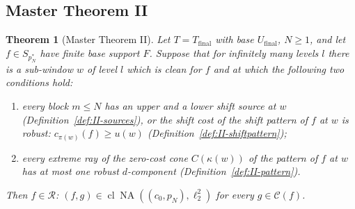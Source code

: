 \documentclass[10pt]{amsart}
\newtheorem{theorem}{Theorem}[section]
\theoremstyle{definition}
\theoremstyle{remark}
\newcommand{\NA}{\operatorname{NA}}
\newcommand{\Cset}{\mathcal C}
\newcommand{\cl}{\operatorname{cl}}
\newcommand{\Rec}{\mathcal R}
\begin{document}
\subsection{Master Theorem II}\label{subsec:II-master2}

\begin{theorem}[Master Theorem II]\label{thm:II-master2}
Let $T=T_{\mathrm{final}}$ with base $U_{\mathrm{final}}$, $N\ge1$, and let
$f\in S_{p_N^*}$ have finite base support $F$.  Suppose that for infinitely
many levels $l$ there is a sub-window $w$ of level $l$ which is clean for $f$
and at which the following two conditions hold:
\begin{enumerate}
\item[\textup{(SH$_w$)}] every block $m\le N$ has an upper and a lower shift
source at $w$ \textup{(}Definition~\textup{\ref{def:II-sources})}, or the
shift cost of the shift pattern of $f$ at $w$ is robust:
$c_{\pi(w)}(f)\ge u(w)$ \textup{(}Definition~\textup{\ref{def:II-shiftpattern})};
\item[\textup{(VR$_w$)}] every extreme ray of the zero-cost cone
$C(\kappa(w))$ of the pattern of $f$ at $w$ has at most one robust
$d$-component \textup{(}Definition~\textup{\ref{def:II-pattern})}.
\end{enumerate}
Then $f\in\Rec$: $(f,g)\in\cl\NA((c_0,p_N),\ell_2^2)$ for every $g\in\Cset(f)$.
\end{theorem}
\end{document}
